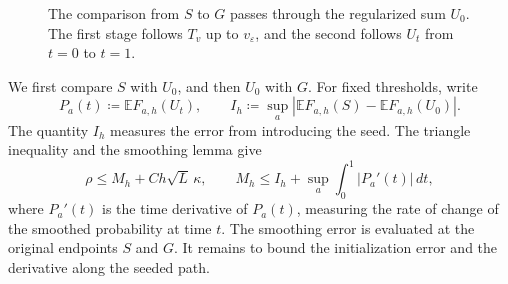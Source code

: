 \documentclass[11pt,letterpaper]{article}
\theoremstyle{remark}
\newcommand{\E}{\mathbb E}
\newcommand{\dd}{\,d}
\begin{document}
\begin{figure}[htbp]
\centering
{}
\caption{The comparison from \(S\) to \(G\) passes through the regularized
sum \(U_0\). The first stage follows \(T_v\) up to \(v_\varepsilon\),
and the second follows \(U_t\) from \(t=0\) to \(t=1\).}
\label{fig:two-stage-path}
\end{figure}

We first compare \(S\) with \(U_0\), and then \(U_0\) with \(G\).
For fixed thresholds, write
\[
 P_a(t)\coloneqq\E F_{a,h}(U_t),\qquad
 I_h\coloneqq\sup_a|\E F_{a,h}(S)-\E F_{a,h}(U_0)|.
\]
The quantity \(I_h\) measures the error from introducing the seed.
The triangle inequality and the smoothing lemma give
\begin{equation}
 \rho\le M_h+Ch\sqrt L\,\kappa,\qquad
 M_h\le I_h+\sup_a\int_0^1|P_a'(t)|\dd t,
 \label{eq:roadmap}
\end{equation}
where \(P_a'(t)\) is the time derivative of \(P_a(t)\), measuring
the rate of change of the smoothed probability at time \(t\).
The smoothing error is evaluated at the original endpoints \(S\)
and \(G\). It remains to bound the initialization error and the
derivative along the seeded path.
\end{document}
